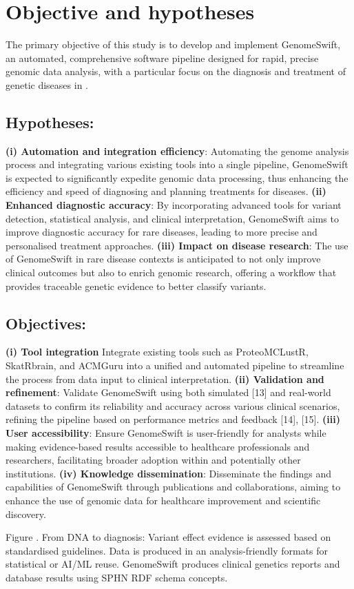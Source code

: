 
\section{Objective and hypotheses}\label{hypotheses-and-objective}

The primary objective of this study is to develop and implement
GenomeSwift, an automated, comprehensive software pipeline designed for
rapid, precise genomic data analysis, with a particular focus on the
diagnosis and treatment of genetic diseases in \kispi.

\hypertarget{hypotheses}{%
\subsection{Hypotheses:}\label{hypotheses}}

\textbf{(i) Automation and integration efficiency}: Automating the
genome analysis process and integrating various existing tools into a
single pipeline, GenomeSwift is expected to significantly expedite
genomic data processing, thus enhancing the efficiency and speed of
diagnosing and planning treatments for diseases. \textbf{(ii) Enhanced
diagnostic accuracy}: By incorporating advanced tools for variant
detection, statistical analysis, and clinical interpretation,
GenomeSwift aims to improve diagnostic accuracy for rare diseases,
leading to more precise and personalised treatment approaches.
\textbf{(iii) Impact on disease research}: The use of GenomeSwift in
rare disease contexts is anticipated to not only improve clinical
outcomes but also to enrich genomic research, offering a workflow that
provides traceable genetic evidence to better classify variants.

\hypertarget{objectives}{%
\subsection{Objectives:}\label{objectives}}

\textbf{(i) Tool integration} Integrate existing tools such as
ProteoMCLustR, SkatRbrain, and ACMGuru into a unified and automated
pipeline to streamline the process from data input to clinical
interpretation. \textbf{(ii) Validation and refinement}: Validate
GenomeSwift using both simulated {[}13{]} and real-world datasets to
confirm its reliability and accuracy across various clinical scenarios,
refining the pipeline based on performance metrics and feedback
{[}14{]}, {[}15{]}. \textbf{(iii) User accessibility}: Ensure
GenomeSwift is user-friendly for analysts while making evidence-based
results accessible to healthcare professionals and researchers,
facilitating broader adoption within \kispi and potentially other
institutions. \textbf{(iv) Knowledge dissemination}: Disseminate the
findings and capabilities of GenomeSwift through publications and
collaborations, aiming to enhance the use of genomic data for healthcare
improvement and scientific discovery.

Figure . From DNA to diagnosis: Variant effect evidence is assessed
based on standardised guidelines. Data is produced in an
analysis-friendly formats for statistical or AI/ML reuse. GenomeSwift
produces clinical genetics reports and database results using SPHN RDF
schema concepts.
